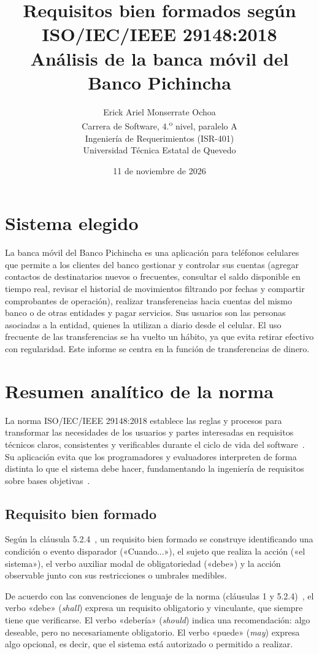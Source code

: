 \documentclass[11pt,a4paper]{article}
\title{Requisitos bien formados según ISO/IEC/IEEE 29148:2018\\
\large Análisis de la banca móvil del Banco Pichincha}
\author{Erick Ariel Monserrate Ochoa\\
Carrera de Software, 4.\textsuperscript{o} nivel, paralelo A\\
Ingeniería de Requerimientos (ISR-401)\\
Universidad Técnica Estatal de Quevedo}
\date{11 de noviembre de 2026}
\begin{document}
\maketitle

\section{Sistema elegido}
\label{sec:sistema}
La banca móvil del Banco Pichincha es una aplicación para teléfonos celulares que permite a los clientes del banco gestionar y controlar sus cuentas (agregar contactos de destinatarios nuevos o frecuentes, consultar el saldo disponible en tiempo real, revisar el historial de movimientos filtrando por fechas y compartir comprobantes de operación), realizar transferencias hacia cuentas del mismo banco o de otras entidades y pagar servicios. Sus usuarios son las personas asociadas a la entidad, quienes la utilizan a diario desde el celular. El uso frecuente de las transferencias se ha vuelto un hábito, ya que evita retirar efectivo con regularidad. Este informe se centra en la función de transferencias de dinero.

\section{Resumen analítico de la norma}
\label{sec:resumen}
La norma ISO/IEC/IEEE 29148:2018 establece las reglas y procesos para transformar las necesidades de los usuarios y partes interesadas en requisitos técnicos claros, consistentes y verificables durante el ciclo de vida del software~\cite{iso29148}. Su aplicación evita que los programadores y evaluadores interpreten de forma distinta lo que el sistema debe hacer, fundamentando la ingeniería de requisitos sobre bases objetivas~\cite{pohl2025}.

\subsection{Requisito bien formado}
Según la cláusula 5.2.4~\cite{iso29148}, un requisito bien formado se construye identificando una condición o evento disparador («Cuando...»), el sujeto que realiza la acción («el sistema»), el verbo auxiliar modal de obligatoriedad («debe») y la acción observable junto con sus restricciones o umbrales medibles.

De acuerdo con las convenciones de lenguaje de la norma (cláusulas 1 y 5.2.4)~\cite{iso29148}, el verbo «debe» (\textit{shall}) expresa un requisito obligatorio y vinculante, que siempre tiene que verificarse. El verbo «debería» (\textit{should}) indica una recomendación: algo deseable, pero no necesariamente obligatorio. El verbo «puede» (\textit{may}) expresa algo opcional, es decir, que el sistema está autorizado o permitido a realizar.
\end{document}
